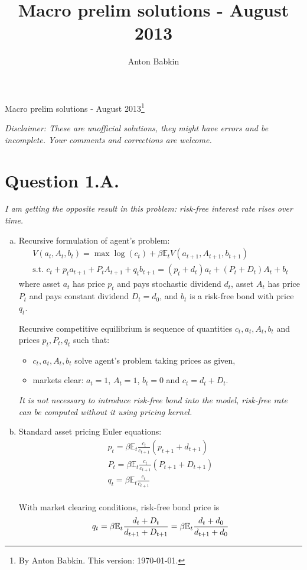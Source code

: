 \documentclass{article}
\title{Macro prelim solutions - August 2013}
\author{Anton Babkin}
\newcommand{\E}{\mathbb{E}}
\begin{document}
{\Large Macro prelim solutions - August 2013\footnote{By Anton
    Babkin. This version: \today.}}

\textit{Disclaimer: These are unofficial solutions, they might have
  errors and be incomplete. Your comments and corrections are welcome.}

\section*{Question 1.A.}

\textit{I am getting the opposite result in this problem: risk-free
  interest rate rises over time.}

\begin{enumerate}[(a)]
\item Recursive formulation of agent's problem:
  \begin{gather*}
    V(a_t,A_t,b_t)=\max \log(c_t) + \beta\E_t V(a_{t+1},A_{t+1},b_{t+1})\\
    \text{s.t. } c_t+p_ta_{t+1}+P_tA_{t+1}+q_tb_{t+1}=(p_t+d_t)a_t+(P_t+D_t)A_t+b_t
  \end{gather*}
  where asset $a_t$ has price $p_t$ and pays stochastic dividend
  $d_t$, asset $A_t$ has price $P_t$ and pays constant dividend
  $D_t=d_0$, and $b_t$ is a risk-free bond with price $q_t$.

  Recursive competitive equilibrium is sequence of quantities
  $c_t,a_t,A_t,b_t$ and prices $p_t,P_t,q_t$ such that:
  \begin{itemize}
  \item $c_t,a_t,A_t,b_t$ solve agent's problem taking prices as given,
  \item markets clear: $a_t=1$, $A_t=1$, $b_t=0$ and $c_t=d_t+D_t$.
  \end{itemize}

  \textit{It is not necessary to introduce risk-free bond into the
    model, risk-free rate can be computed without it using pricing
    kernel.}


\item Standard asset pricing Euler equations:
  \begin{gather*}
    p_t=\beta\E_t\frac{c_t}{c_{t+1}}(p_{t+1}+d_{t+1})\\
    P_t=\beta\E_t\frac{c_t}{c_{t+1}}(P_{t+1}+D_{t+1})\\
    q_t=\beta\E_t\frac{c_t}{c_{t+1}}\\
  \end{gather*}

  With market clearing conditions, risk-free bond price is
  \begin{equation*}
    q_t=\beta\E_t\frac{d_t+D_t}{d_{t+1}+D_{t+1}}=\beta\E_t\frac{d_t+d_0}{d_{t+1}+d_0}\\
  \end{equation*}


\end{enumerate}
\end{document}
